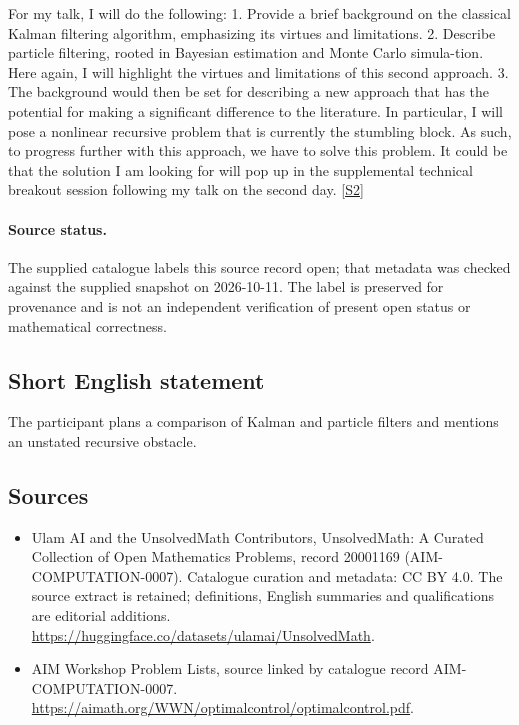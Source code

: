 \documentclass[11pt]{article}
\newcommand{\sref}[2]{\hyperlink{source:#1:#2}{[S#2]}}
\begin{document}
For my talk, I will do the following: 1. Provide a brief background on the classical Kalman filtering algorithm, emphasizing its virtues and limitations. 2. Describe particle filtering, rooted in Bayesian estimation and Monte Carlo simula-tion. Here again, I will highlight the virtues and limitations of this second approach. 3. The background would then be set for describing a new approach that has the potential for making a significant difference to the literature. In particular, I will pose a nonlinear recursive problem that is currently the stumbling block. As such, to progress further with this approach, we have to solve this problem. It could be that the solution I am looking for will pop up in the supplemental technical breakout session following my talk on the second day. \sref{20001169}{2}
\paragraph{Source status.}
The supplied catalogue labels this source record open; that metadata was checked against the supplied snapshot on 2026-10-11. The label is preserved for provenance and is not an independent verification of present open status or mathematical correctness.
\subsection{Short English statement}
The participant plans a comparison of Kalman and particle filters and mentions an unstated recursive obstacle.
\subsection{Sources}
\begin{itemize}
\item[\hypertarget{source:20001169:1}{S1}] Ulam AI and the UnsolvedMath Contributors, UnsolvedMath: A Curated Collection of Open Mathematics Problems, record 20001169 (AIM-COMPUTATION-0007). Catalogue curation and metadata: CC BY 4.0. The source extract is retained; definitions, English summaries and qualifications are editorial additions.
\url{https://huggingface.co/datasets/ulamai/UnsolvedMath}.
\item[\hypertarget{source:20001169:2}{S2}] AIM Workshop Problem Lists, source linked by catalogue record AIM-COMPUTATION-0007.
\url{https://aimath.org/WWN/optimalcontrol/optimalcontrol.pdf}.
\end{itemize}
\end{document}
